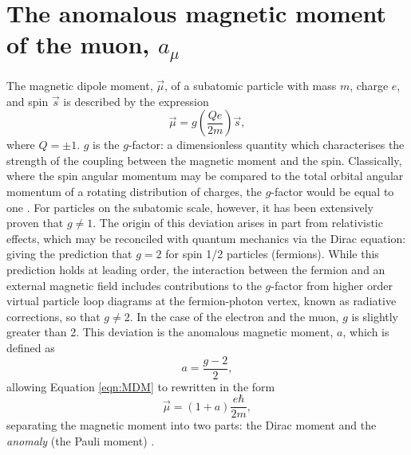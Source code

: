 \section{The anomalous magnetic moment of the muon, $a_{\mu}$} \label{sec:TheMDM}
%
The magnetic dipole moment, $\vec{\mu}$, of a subatomic particle with mass $m$, charge $e$, and spin $\vec{s}$ is described by the expression %
%
\begin{equation} 
  \vec{\mu} = g\left(\frac{Qe}{2m}\right)\vec{s},
  \label{eqn:MDM}
\end{equation}
%
where $Q=\pm1$. $g$ is the $g$-factor: a dimensionless quantity which characterises the strength of the coupling between the magnetic moment and the spin. Classically, where the spin angular momentum may be compared to the total orbital angular momentum of a rotating distribution of charges, the $g$-factor would be equal to one \cite{Jackson}. For particles on the subatomic scale, however, it has been extensively proven that $g\neq1$. %
%
The origin of this deviation arises in part from relativistic effects, which may be reconciled with quantum mechanics via the Dirac equation: giving the prediction that $g=2$ for spin 1/2 particles (fermions). While this prediction holds at leading order, the interaction between the fermion and an external magnetic field includes contributions to the $g$-factor from higher order virtual particle loop diagrams at the fermion-photon vertex, known as radiative corrections, so that $g\neq2$. In the case of the electron and the muon, $g$ is slightly greater than 2. This deviation is the anomalous magnetic moment, $a$, which is defined as 
%
%
\begin{equation}
  a = \frac{g-2}{2},
  \label{eqn:AnaMagMom}
\end{equation}
% 
allowing Equation \ref{eqn:MDM} to rewritten in the form
%
\begin{equation}
  \vec{\mu} = (1+a)\frac{e\hbar}{2m},
  \label{eqn:MDM2}
\end{equation}
% 
separating the magnetic moment into two parts: the Dirac moment and the \textit{anomaly} (the Pauli moment) \cite{LeptonDipoleMoments}. 

